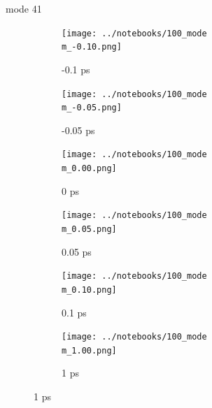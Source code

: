 \documentclass{beamer}
\newcommand\w{0.32}
\begin{document}
\renewcommand\m{41}
\begin{frame}{mode \m}
	\begin{figure}
		\centering
		\begin{subfigure}[b]{\w\textwidth}
			\centering
			\texttt{[image: ../notebooks/100\_mode\\m\_-0.10.png]}
			\caption{-0.1 ps}
		\end{subfigure}
		\begin{subfigure}[b]{\w\textwidth}
			\centering
			\texttt{[image: ../notebooks/100\_mode\\m\_-0.05.png]}
			\caption{-0.05 ps}
		\end{subfigure}
		\begin{subfigure}[b]{\w\textwidth}
			\centering
			\texttt{[image: ../notebooks/100\_mode\\m\_0.00.png]}
			\caption{0 ps}
		\end{subfigure}
		\begin{subfigure}[b]{\w\textwidth}
			\centering
			\texttt{[image: ../notebooks/100\_mode\\m\_0.05.png]}
			\caption{0.05 ps}
		\end{subfigure}
		\begin{subfigure}[b]{\w\textwidth}
			\centering
			\texttt{[image: ../notebooks/100\_mode\\m\_0.10.png]}
			\caption{0.1 ps}
		\end{subfigure}
		\begin{subfigure}[b]{\w\textwidth}
			\centering
			\texttt{[image: ../notebooks/100\_mode\\m\_1.00.png]}
			\caption{1 ps}
		\end{subfigure}
	\end{figure}
\end{frame}
\end{document}
